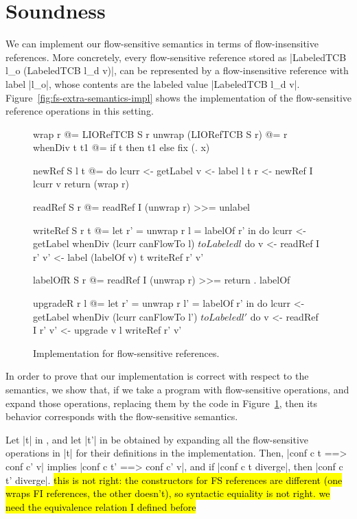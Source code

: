 \section{Soundness}
\label{sec:soundness}

We can implement our flow-sensitive semantics in terms of
flow-insensitive references. More concretely, every flow-sensitive
reference stored as |LabeledTCB l_o (LabeledTCB l_d v)|, can be
represented by a flow-insensitive reference with label |l_o|, whose
contents are the labeled value |LabeledTCB l_d
v|. Figure~\ref{fig:fs-extra-semantics-impl} shows the implementation
of the flow-sensitive reference operations in this setting.

\begin{figure}
\small
\begin{code}
wrap r @= LIORefTCB S r
unwrap (LIORefTCB S r) @= r
whenDiv t t1 @= if t then t1 else fix (\x. x)

newRef S l t @= do
  lcurr  <- getLabel
  v      <- label l t
  r      <- newRef I lcurr v
  return (wrap r)


readRef S r @= readRef I (unwrap r) >>= unlabel


writeRef S r t @= let  r'  = unwrap r
                       l   = labelOf r' in do
  lcurr <- getLabel
  whenDiv (lcurr canFlowTo l) $ toLabeled l $ do
     v   <- readRef I r'
     v'  <- label (labelOf v) t
     writeRef r' v'


labelOfR S r @= readRef I (unwrap r) >>= return . labelOf

upgradeR r l @= let  r'  = unwrap r
                     l'  = labelOf r' in do
  lcurr <- getLabel
  whenDiv (lcurr canFlowTo l') $ toLabeled l' $ do
     v   <- readRef I r'
     v'  <- upgrade v l
     writeRef r' v'

\end{code}
\caption{Implementation for flow-sensitive references.\label{fig:fs-exts-semantics-impl}}
\end{figure}

In order to prove that our implementation is correct with respect to
the semantics, we show that, if we take a program with flow-sensitive
operations, and expand those operations, replacing them by the code in
Figure~\ref{fig:fs-exts-semantics-impl}, then its behavior corresponds
with the flow-sensitive semantics.

\begin{theorem}\label{thm:eq} Let |t| in \liofs{}, and let |t'| in \lio{} be
  obtained by expanding all the flow-sensitive operations in |t| for
  their definitions in the implementation. Then, |conf c t ==> conf
  c' v| implies |conf c t' ==> conf c' v|, and if |conf c t diverge|,
  then |conf c t' diverge|.
  \textrm{\hl{this is not right: the constructors for FS references are
  different (one wraps FI references, the other doesn't), so syntactic
  equiality is not right.  we need the equivalence relation I defined before}}
\end{theorem}

